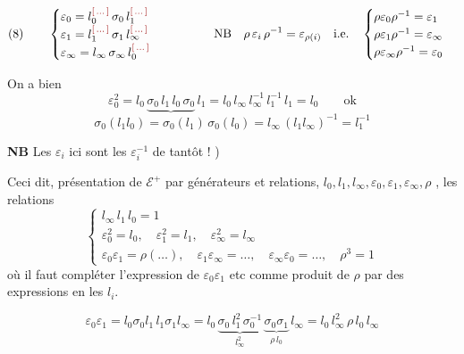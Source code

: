 \documentclass[11pt,a4paper]{article}
\begin{document}
\[
(8) \qquad
\begin{cases}
\varepsilon_0 = l_0^{\ill{}}\, \sigma_0\, l_1^{\ill{}} \\
\varepsilon_1 = l_1^{\ill{}}\, \sigma_1\, l_\infty^{\ill{}} \\
\varepsilon_\infty = l_\infty\, \sigma_\infty\, l_0^{\ill{}}
\end{cases}
\qquad\qquad
\text{NB} \quad \rho\,\varepsilon_i\,\rho^{-1} = \varepsilon_{\rho(i)}
\quad \text{i.e.} \quad
\begin{cases}
\rho\varepsilon_0\rho^{-1} = \varepsilon_1 \\
\rho\varepsilon_1\rho^{-1} = \varepsilon_\infty \\
\rho\varepsilon_\infty\rho^{-1} = \varepsilon_0
\end{cases}
\]


On a bien
\[
\varepsilon_0^2 = l_0\, \underbrace{\sigma_0\, l_1\, l_0\, \sigma_0}\, l_1
= l_0\, l_\infty\, l_\infty^{-1}\, l_1^{-1}\, l_1 = l_0 \qquad \text{ok}
\]
\[
\sigma_0(l_1 l_0) = \sigma_0(l_1)\, \sigma_0(l_0) = l_\infty\, (l_1 l_\infty)^{-1} = l_1^{-1}
\]


\textbf{NB} Les $\varepsilon_i$ ici sont les $\varepsilon_i^{-1}$ de tantôt !
)

Ceci dit,  présentation de
$\mathcal{E}^{+}$ par générateurs et relations,
$l_0, l_1, l_\infty, \varepsilon_0, \varepsilon_1, \varepsilon_\infty, \rho$
, les relations
\[
\begin{cases}
l_\infty\, l_1\, l_0 = 1 \\
\varepsilon_0^2 = l_0, \quad \varepsilon_1^2 = l_1, \quad \varepsilon_\infty^2 = l_\infty \\
\varepsilon_0\varepsilon_1 = \rho(\ldots), \quad \varepsilon_1\varepsilon_\infty = \ldots, \quad \varepsilon_\infty\varepsilon_0 = \ldots, \quad \rho^3 = 1
\end{cases}
\]
où il faut compléter l'expression de $\varepsilon_0\varepsilon_1$ etc comme
produit de $\rho$ par des expressions en les $l_i$.

\[
\varepsilon_0\varepsilon_1 = l_0\sigma_0 l_1\, l_1\sigma_1 l_\infty
= l_0\, \underbrace{\sigma_0\, l_1^2\, \sigma_0^{-1}}_{l_\infty^2}\,
\underbrace{\sigma_0\sigma_1}_{\rho\, l_0}\, l_\infty
= l_0\, l_\infty^2\, \rho\, l_0\, l_\infty
\]
\end{document}
